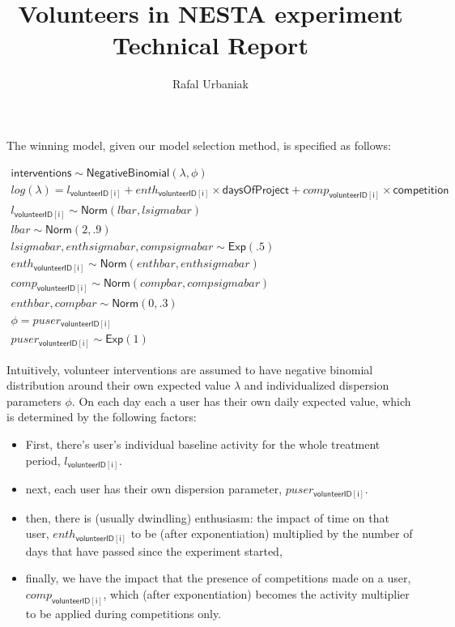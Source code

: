 \documentclass[
  10pt,
  dvipsnames, enabledeprecatedfontcommands]{scrartcl}
\title{Volunteers in NESTA experiment \linebreak  Technical Report}
\author{Rafal Urbaniak}
\date{}
\begin{document}
\maketitle

The winning model, given our model selection method, is specified as
follows:

\begin{align*}
\mathsf{interventions} \sim \mathsf{NegativeBinomial} (\lambda,\phi) \\
log(\lambda) = l_\mathsf{volunteerID[i]} + enth_\mathsf{ volunteerID[i]} \times \mathsf{daysOfProject} + comp_\mathsf{volunteerID[i]} \times \mathsf{competition}\\  
l_\mathsf{ volunteerID[i] }  \sim \mathsf{Norm}(lbar,lsigmabar) \\
lbar \sim \mathsf{Norm}(2, .9)\\
lsigmabar, enthsigmabar, compsigmabar \sim  \mathsf{Exp}(.5) \\
enth _\mathsf{ volunteerID[i] }  \sim \mathsf{Norm}(enthbar, enthsigmabar)\\
comp_\mathsf{ volunteerID[i] } \sim \mathsf{Norm}(compbar, compsigmabar) \\
enthbar, compbar \sim  \mathsf{Norm}(0, .3)\\
 \phi =  puser_\mathsf{ volunteerID[i] }  \\
 puser_\mathsf{ volunteerID[i] } \sim \mathsf{Exp}(1)
\end{align*}

Intuitively, volunteer interventions are assumed to have negative
binomial distribution around their own expected value \(\lambda\) and
individualized dispersion parameters \(\phi\). On each day each a user
has their own daily expected value, which is determined by the following
factors:

\begin{itemize}
\item First, there's user's individual baseline activity for the whole treatment period, $l_\mathsf{ volunteerID[i] }$.
\item next, each user has their own dispersion parameter,  $puser_\mathsf{ volunteerID[i] }$.
\item then, there is (usually dwindling) enthusiasm: the impact of time on that user, $enth_\mathsf{volunteerID[i]} $ to be (after exponentiation) multiplied by the number of days that have passed since the experiment started,
\item finally, we have the impact that the presence of competitions made on a user, $comp_\mathsf{ volunteerID[i] }$, which (after exponentiation) becomes the activity multiplier to be applied during competitions only.
\end{itemize}
\end{document}
